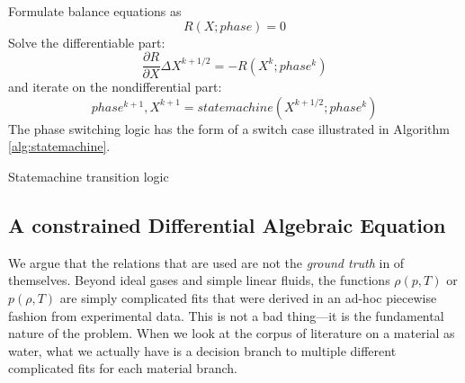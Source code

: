 \documentclass[AMA,STIX1COL]{WileyNJD-v2}
\begin{document}
Formulate balance equations as
\begin{equation}
R(X ; phase) = 0
\end{equation}
Solve the differentiable part:
\[\frac{\partial R}{\partial X}\Delta X^{k+1/2} = -R(X^k ; phase^k)\]
and iterate on the nondifferential part:
\[phase^{k+1},X^{k+1} = statemachine(X^{k+1/2} ; phase^k)\]
The phase switching logic has the form of a switch case illustrated in
Algorithm \ref{alg:statemachine}.

\begin{algorithm}
  \caption{\label{alg:statemachine}Statemachine transition logic}
\begin{Shaded}
\begin{Highlighting}[]
    \NormalTok{:}
    \NormalTok{:}
\end{Highlighting}
\end{Shaded}
\end{algorithm}

\hypertarget{header-n3262}{%
\subsection{A constrained Differential Algebraic
Equation}\label{header-n3262}}

We argue that the relations that are used are not the \emph{ground
truth} in of themselves. Beyond ideal gases and simple linear fluids,
the functions \(\rho(p,T)\) or \(p(\rho,T)\) are simply complicated fits
that were derived in an ad-hoc piecewise fashion from experimental data.
This is not a bad thing---it is the fundamental nature of the problem.
When we look at the corpus of literature on a material as water, what we
actually have is a decision branch to multiple different complicated
fits for each material branch.
\end{document}

